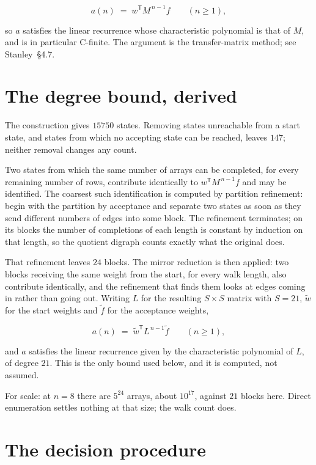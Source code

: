 \documentclass[11pt]{article}
\theoremstyle{definition}
\begin{document}
\[a(n) \;=\; w^{\mathsf T} M^{\,n-1} f \qquad (n \ge 1),\]

so $a$ satisfies the linear recurrence whose characteristic polynomial is that of $M$, and is in particular C-finite. The argument is the transfer-matrix method; see Stanley~\S4.7.

\section{The degree bound, derived}

The construction gives $15750$ states. Removing states unreachable from a start state, and states from which no accepting state can be reached, leaves $147$; neither removal changes any count.

Two states from which the same number of arrays can be completed, for every remaining number of rows, contribute identically to $w^{\mathsf T}M^{\,n-1}f$ and may be identified. The coarsest such identification is computed by partition refinement: begin with the partition by acceptance and separate two states as soon as they send different numbers of edges into some block. The refinement terminates; on its blocks the number of completions of each length is constant by induction on that length, so the quotient digraph counts exactly what the original does.

That refinement leaves $24$ blocks. The mirror reduction is then applied: two blocks receiving the same weight from the start, for every walk length, also contribute identically, and the refinement that finds them looks at edges coming in rather than going out. Writing $L$ for the resulting $S \times S$ matrix with $S = 21$, $\tilde w$ for the start weights and $\tilde f$ for the acceptance weights,

\[a(n) \;=\; \tilde w^{\mathsf T} L^{\,n-1} \tilde f \qquad (n \ge 1),\]

and $a$ satisfies the linear recurrence given by the characteristic polynomial of $L$, of degree $21$. This is the only bound used below, and it is computed, not assumed.

For scale: at $n = 8$ there are $5^{24}$ arrays, about $10^{17}$, against $21$ blocks here. Direct enumeration settles nothing at that size; the walk count does.

\section{The decision procedure}
\end{document}
